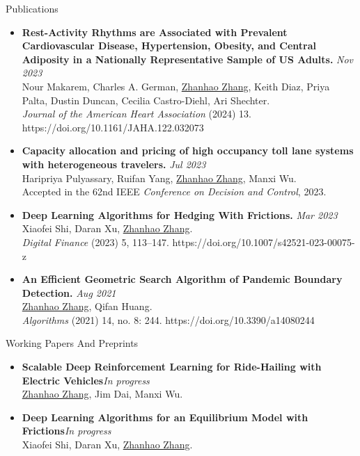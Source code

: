 \documentclass{resume} %
\begin{document}
\begin{rSection}{Publications}
\begin{itemize}
\item {\bf Rest-Activity Rhythms are Associated with Prevalent Cardiovascular Disease, Hypertension, Obesity, and Central Adiposity in a Nationally Representative Sample of US Adults.} \hfill {\em Nov 2023}\\
Nour Makarem, Charles A. German, \underline{Zhanhao Zhang}, Keith Diaz, Priya Palta, Dustin Duncan, Cecilia Castro-Diehl, Ari Shechter.\\
\textit{Journal of the American Heart Association} (2024) 13. https://doi.org/10.1161/JAHA.122.032073
\item {\bf Capacity allocation and pricing of high occupancy toll lane systems with heterogeneous travelers.} \hfill {\em Jul 2023}\\
Haripriya Pulyassary, Ruifan Yang, \underline{Zhanhao Zhang}, Manxi Wu.\\
Accepted in the 62nd IEEE \textit{Conference on Decision and Control}, 2023.
\item {\bf Deep Learning Algorithms for Hedging With Frictions.} \hfill {\em Mar 2023}\\
Xiaofei Shi, Daran Xu, \underline{Zhanhao Zhang}.\\
\textit{Digital Finance} (2023) 5, 113–147. https://doi.org/10.1007/s42521-023-00075-z
\item {\bf An Efficient Geometric Search Algorithm of Pandemic Boundary Detection.} \hfill {\em Aug 2021}\\
\underline{Zhanhao Zhang}, Qifan Huang.\\
\textit{Algorithms} (2021) 14, no. 8: 244. https://doi.org/10.3390/a14080244
\end{itemize}
\end{rSection}

\begin{rSection}{Working Papers And Preprints}
\begin{itemize}
\item {\bf Scalable Deep Reinforcement Learning for Ride-Hailing with Electric Vehicles}\hfill {\em In progress}\\
\underline{Zhanhao Zhang}, Jim Dai, Manxi Wu.
\item {\bf Deep Learning Algorithms for an Equilibrium Model with Frictions}\hfill {\em In progress}\\
Xiaofei Shi, Daran Xu, \underline{Zhanhao Zhang}.
\end{itemize}
\end{rSection}
\end{document}

